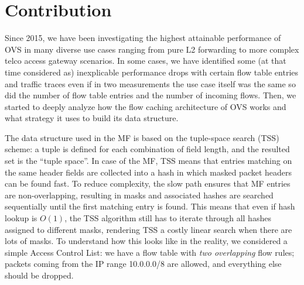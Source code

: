 \documentclass[a4paper,10pt]{article}
\begin{document}
\section{Contribution}
Since 2015, we have been investigating the highest attainable performance 
of OVS in many diverse use cases ranging from pure L2 forwarding to more complex telco access gateway scenarios. 
In some cases, we have identified some (at that time considered as) inexplicable performance drops with certain flow table entries and traffic traces even if in two measurements the use case itself was the same so did the number of flow table entries and the number of incoming flows.
Then, we started to deeply analyze how the flow caching architecture of OVS works and what strategy it uses to build its data structure.

The data structure used in the MF is based on the tuple-space search (TSS) scheme: a tuple is defined for each combination of field length, and the resulted set is the ``tuple space''. 
In case of the MF, TSS means that entries matching on the same header fields are collected into a hash in which masked packet headers can be found fast.
To reduce complexity, the slow path ensures that MF entries are non-overlapping, resulting in masks and associated hashes are searched sequentially until the first matching entry is found.
This means that even if hash lookup is $O(1)$, the TSS algorithm still has to iterate through all hashes assigned to different masks, rendering TSS a costly linear search when there are lots of masks.
To understand how this looks like in the reality, we considered a simple Access Control List:
we have a flow table with \textit{two overlapping} flow rules; packets coming from the IP range 10.0.0.0/8 are allowed, and everything else should be dropped.
\end{document}
